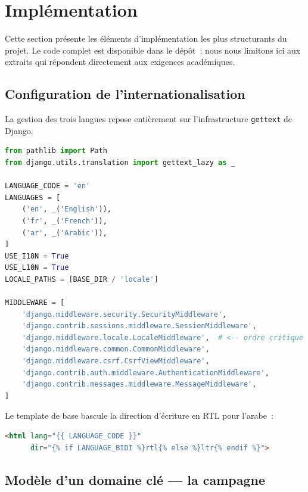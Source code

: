 \section{Implémentation}
\label{sec:impl}

Cette section présente les éléments d'implémentation les plus structurants
du projet. Le code complet est disponible dans le dépôt~; nous nous
limitons ici aux extraits qui répondent directement aux exigences
académiques.

\subsection{Configuration de l'internationalisation}

La gestion des trois langues repose entièrement sur l'infrastructure
\texttt{gettext} de Django.

\begin{lstlisting}[language=Python,caption={Extrait de
crm\_project/settings.py},label=lst:i18n]
from pathlib import Path
from django.utils.translation import gettext_lazy as _

LANGUAGE_CODE = 'en'
LANGUAGES = [
    ('en', _('English')),
    ('fr', _('French')),
    ('ar', _('Arabic')),
]
USE_I18N = True
USE_L10N = True
LOCALE_PATHS = [BASE_DIR / 'locale']

MIDDLEWARE = [
    'django.middleware.security.SecurityMiddleware',
    'django.contrib.sessions.middleware.SessionMiddleware',
    'django.middleware.locale.LocaleMiddleware',  # <-- ordre critique
    'django.middleware.common.CommonMiddleware',
    'django.middleware.csrf.CsrfViewMiddleware',
    'django.contrib.auth.middleware.AuthenticationMiddleware',
    'django.contrib.messages.middleware.MessageMiddleware',
]
\end{lstlisting}

Le template de base bascule la direction d'écriture en RTL pour l'arabe~:

\begin{lstlisting}[language=HTML,caption={templates/base.html (extrait)}]
<html lang="{{ LANGUAGE_CODE }}"
      dir="{% if LANGUAGE_BIDI %}rtl{% else %}ltr{% endif %}">
\end{lstlisting}

\subsection{Modèle d'un domaine clé --- la campagne}

